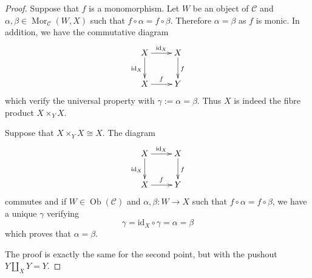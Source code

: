 \documentclass{stacks-project}
\theoremstyle{plain}
\theoremstyle{definition}
\theoremstyle{remark}
\numberwithin{equation}{subsection}
\def\Mor{\mathop{\mathrm{Mor}}\nolimits}
\def\Ob{\mathop{\mathrm{Ob}}\nolimits}
\begin{document}
\begin{proof}
Suppose that $f$ is a monomorphism. Let $W$ be an object of $\mathcal C$
and $\alpha, \beta \in \Mor_\mathcal C(W,X)$ such that $f\circ \alpha = f\circ
\beta$. Therefore $\alpha = \beta$ as $f$ is monic. In addition, we have the
commutative diagram
$$
\xymatrix{
X \ar[r]^{\text{id}_X} \ar[d]_{\text{id}_X} & X \ar[d]^{f} \\
X \ar[r]^{f} & Y
}
$$
which verify the universal property with $\gamma := \alpha = \beta$.
Thus $X$ is indeed the fibre product $X\times_Y X$.

\medskip\noindent
Suppose that $X \times_Y X \cong X $. The diagram
$$
\xymatrix{
X \ar[r]^{\text{id}_X} \ar[d]_{\text{id}_X} & X \ar[d]^{f} \\
X \ar[r]^{f} & Y }
$$
commutes and if $W \in \Ob(\mathcal C)$ and $\alpha, \beta : W \to X$
such that $f \circ \alpha = f \circ \beta$, we have a unique
$\gamma$ verifying
$$
\gamma = \text{id}_X\circ\gamma = \alpha = \beta
$$
which proves that $\alpha = \beta$.

\medskip\noindent
The proof is exactly the same for the second point, but with the
pushout $Y\amalg_X Y = Y$.
\end{proof}
\end{document}
